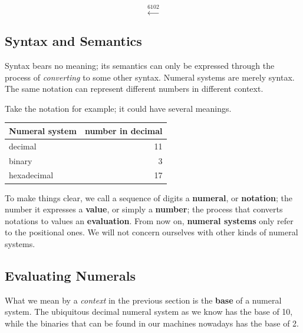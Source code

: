 \documentclass[\main/thesis.tex]{subfiles}
\begin{document}
$$ \xleftarrow{6102} $$

\subsection{Syntax and Semantics}

Syntax bears no meaning;
its semantics can only be expressed through the process of \textit{converting} to some other syntax.
Numeral systems are merely syntax.
The same notation can represent different numbers in different context.

Take the notation  for example; it could have several meanings.

\begin{center}
    \begin{tabular}{ | l | r | }
    \textbf{Numeral system}      & \textbf{number in decimal}  \\
    \hline
    decimal             & 11    \\
    binary              & 3     \\
    hexadecimal         & 17    \\
    \end{tabular}
\end{center}

To make things clear, we call a sequence of digits a \textbf{numeral}, or \textbf{notation};
the number it expresses a \textbf{value}, or simply a \textbf{number};
the process that converts notations to values an \textbf{evaluation}.
From now on, \textbf{numeral systems} only refer to the positional ones.
We will not concern ourselves with other kinds of numeral systems.

\subsection{Evaluating Numerals}

What we mean by a \textit{context} in the previous section is the \textbf{base}
of a numeral system.
The ubiquitous decimal numeral system as we know has the base of 10,
while the binaries that can be found in our machines nowadays has the base of 2.
\end{document}
